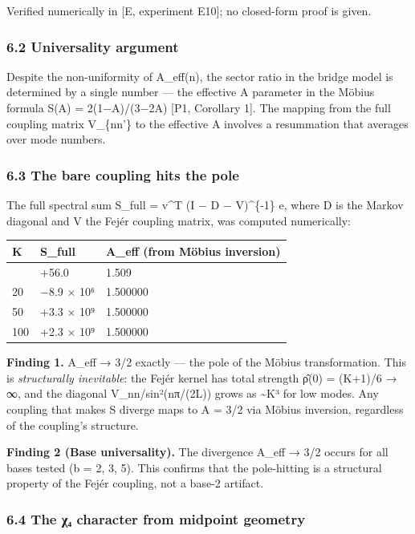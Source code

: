 \documentclass[
  11pt,
]{article}
\begin{document}
Verified numerically in {[}E, experiment E10{]}; no closed-form proof is given.

\subsubsection{6.2 Universality argument}\label{universality-argument}

Despite the non-uniformity of A\_eff(n), the sector ratio in the bridge model is
determined by a single number --- the effective A parameter in the Möbius
formula S(A) = 2(1−A)/(3−2A) {[}P1, Corollary 1{]}. The mapping from the full
coupling matrix V\_\{nn'\} to the effective A involves a resummation that
averages over mode numbers.

\subsubsection{6.3 The bare coupling hits the
pole}\label{the-bare-coupling-hits-the-pole}

The full spectral sum S\_full = v\^{}T (I − D − V)\^{}\{-1\} e, where D is the
Markov diagonal and V the Fejér coupling matrix, was computed numerically:

\begin{longtable}[]{@{}lll@{}}
\toprule\noalign{}
K & S\_full & A\_eff (from Möbius inversion) \\
\midrule\noalign{}
\endhead
\bottomrule\noalign{}
\endlastfoot
10 & +56.0 & 1.509 \\
20 & −8.9 × 10⁶ & 1.500000 \\
50 & +3.3 × 10⁹ & 1.500000 \\
100 & +2.3 × 10⁹ & 1.500000 \\
\end{longtable}

\textbf{Finding 1.} A\_eff → 3/2 exactly --- the pole of the Möbius
transformation. This is \emph{structurally inevitable}: the Fejér kernel has
total strength ρ̂(0) = (K+1)/6 → ∞, and the diagonal V\_nn/sin²(nπ/(2L)) grows as
\textasciitilde K³ for low modes. Any coupling that makes S diverge maps to A =
3/2 via Möbius inversion, regardless of the coupling's structure.

\textbf{Finding 2 (Base universality).} The divergence A\_eff → 3/2 occurs for
all bases tested (b = 2, 3, 5). This confirms that the pole-hitting is a
structural property of the Fejér coupling, not a base-2 artifact.

\subsubsection{6.4 The χ₄ character from midpoint
geometry}\label{the-ux3c7ux2084-character-from-midpoint-geometry}
\end{document}
